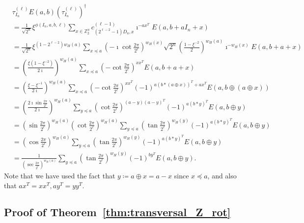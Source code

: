 \documentclass[twoside,romanappendices]{IEEEtran}
\newcommand{\Fn}{\mathbb{Z}_2^n}
\begin{document}
\begin{align}
& \tau_{I_n}^{(\ell)} E(a,b) (\tau_{I_n}^{(\ell)})^{\dagger} \nonumber \\
%
  & = \frac{1}{\sqrt{2^n}} \xi^{\phi(I_n,a,b,\ell)} \sum_{x \in \Fn} c_{(2^{\ell-2} - 1) D_a, x}^{(\ell-1)} \imath^{-a x^T} E(a, b + a I_n + x) \\
%
  & = \frac{1}{\sqrt{2^n}} \xi^{(1 - 2^{\ell-2}) w_H(a)} \sum_{x \preceq a} \left( -\imath \cot\frac{2\pi}{2^\ell} \right)^{w_H(x)} \sqrt{2^n} \left( \frac{1 - \xi^{-2}}{2} \right)^{w_H(a)} \imath^{-w_H(x)} E(a, b + a + x) \\
%
  & = \left( \frac{\xi(1 - \xi^{-2})}{2 \imath} \right)^{w_H(a)} \sum_{x \preceq a} \left( - \cot\frac{2\pi}{2^\ell} \right)^{xx^T} E(a, b + a + x) \\
%
  & = \left( \frac{\xi - \xi^{-1}}{2 \imath} \right)^{w_H(a)} \sum_{x \preceq a} \left( - \cot\frac{2\pi}{2^\ell} \right)^{xx^T} (-1)^{a(b \ast (a \oplus x))^T + a x^T} E(a, b \oplus (a \oplus x)) \\
%
  & = \left( \frac{2\imath \sin\frac{2\pi}{2^\ell}}{2 \imath} \right)^{w_H(a)} \sum_{y \preceq a} \left( \cot\frac{2\pi}{2^\ell} \right)^{(a - y) (a - y)^T} (-1)^{a(b \ast y)^T} E(a, b \oplus y) \\
%
  & = \left( \sin\frac{2\pi}{2^\ell} \right)^{w_H(a)} \left( \cot\frac{2\pi}{2^\ell} \right)^{w_H(a)} \sum_{y \preceq a} \left( \tan\frac{2\pi}{2^\ell} \right)^{w_H(y)} (-1)^{a(b \ast y)^T} E(a, b \oplus y) \\
%
  & = \left( \cos\frac{2\pi}{2^\ell} \right)^{w_H(a)} \sum_{y \preceq a} \left( \tan\frac{2\pi}{2^\ell} \right)^{w_H(y)} (-1)^{a(b \ast y)^T} E(a, b \oplus y) \\
%
  & = \frac{1}{\left( \sec\frac{2\pi}{2^\ell} \right)^{w_H(a)}} \sum_{y \preceq a} \left( \tan\frac{2\pi}{2^\ell} \right)^{w_H(y)} (-1)^{by^T} E(a, b \oplus y).
\end{align}
Note that we have used the fact that $y \coloneqq a \oplus x = a - x$ since $x \preceq a$, and also that $a x^T = xx^T, a y^T = yy^T$.
\hfill\IEEEQEDhere



\subsection{Proof of Theorem~\ref{thm:transversal_Z_rot}}
\label{sec:proof_transversal_Z_rot}
\end{document}
